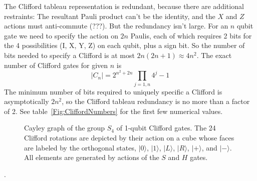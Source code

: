 The Clifford tableau representation is redundant, because there are additional restraints: The resultant Pauli product can't be the identity, and the $X$ and $Z$ actions must anti-commute (???). But the redundancy isn't large. For an $n$ qubit gate we need to specify the action on $2n$ Paulis, each of which requires 2 bits for the 4 possibilities (I, X, Y, Z) on each qubit, plus a sign bit. So the number of bits needed to specify a Clifford is at most $2n(2n+1)\approx 4n^2$. 
The exact number of Clifford gates for given $n$ is
\[
|C_n| = 2^{n^2+2n} \prod_{j=1,n} 4^j-1
\]
The minimum number of bits required to uniquely specific a Clifford is asymptotically $2n^2$, so the Clifford tableau redundancy is no more than a factor of 2. See table~\ref{Fig:CliffordNumbers} for the first few numerical values.

%
%
%
%
%


\begin{figure}
\begin{center}
\end{center}
\caption[Cayley graph of the group $S_4$ of 1-qubit Clifford gates]{Cayley graph of the group $S_4$ of 1-qubit Clifford gates. The 24 Clifford rotations are depicted by their action on a cube whose faces are labeled by the orthogonal states, $|0\rangle$, $|1\rangle$, $|L\rangle$, $|R\rangle$, $|+\rangle$, and $|-\rangle$. All elements are generated by actions of the $S$ and $H$ gates.
\footnotemark
{}
}
\end{figure}
.
